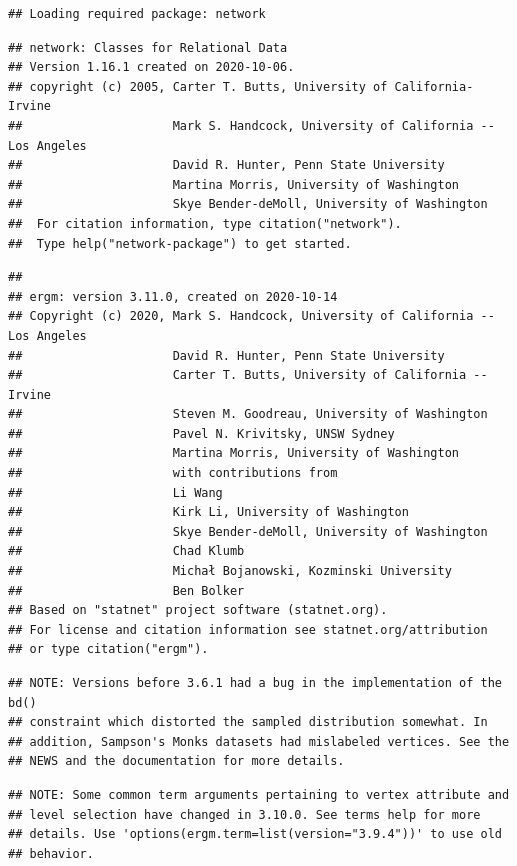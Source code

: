 \documentclass[
]{book}
\begin{document}
\begin{verbatim}
## Loading required package: network
\end{verbatim}

\begin{verbatim}
## network: Classes for Relational Data
## Version 1.16.1 created on 2020-10-06.
## copyright (c) 2005, Carter T. Butts, University of California-Irvine
##                     Mark S. Handcock, University of California -- Los Angeles
##                     David R. Hunter, Penn State University
##                     Martina Morris, University of Washington
##                     Skye Bender-deMoll, University of Washington
##  For citation information, type citation("network").
##  Type help("network-package") to get started.
\end{verbatim}

\begin{verbatim}
## 
## ergm: version 3.11.0, created on 2020-10-14
## Copyright (c) 2020, Mark S. Handcock, University of California -- Los Angeles
##                     David R. Hunter, Penn State University
##                     Carter T. Butts, University of California -- Irvine
##                     Steven M. Goodreau, University of Washington
##                     Pavel N. Krivitsky, UNSW Sydney
##                     Martina Morris, University of Washington
##                     with contributions from
##                     Li Wang
##                     Kirk Li, University of Washington
##                     Skye Bender-deMoll, University of Washington
##                     Chad Klumb
##                     Michał Bojanowski, Kozminski University
##                     Ben Bolker
## Based on "statnet" project software (statnet.org).
## For license and citation information see statnet.org/attribution
## or type citation("ergm").
\end{verbatim}

\begin{verbatim}
## NOTE: Versions before 3.6.1 had a bug in the implementation of the bd()
## constraint which distorted the sampled distribution somewhat. In
## addition, Sampson's Monks datasets had mislabeled vertices. See the
## NEWS and the documentation for more details.
\end{verbatim}

\begin{verbatim}
## NOTE: Some common term arguments pertaining to vertex attribute and
## level selection have changed in 3.10.0. See terms help for more
## details. Use 'options(ergm.term=list(version="3.9.4"))' to use old
## behavior.
\end{verbatim}
\end{document}
